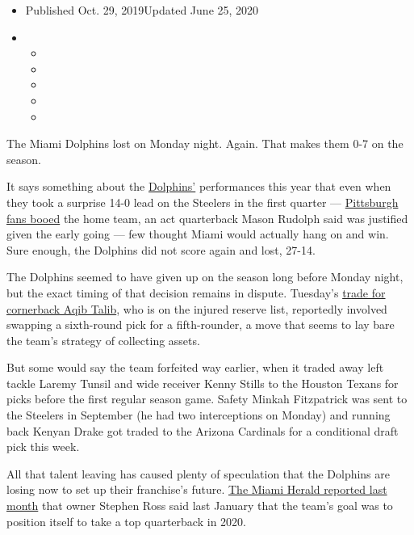 \begin{itemize}
\item
  Published Oct. 29, 2019Updated June 25, 2020
\item
  \begin{itemize}
  \item
  \item
  \item
  \item
  \item
  \end{itemize}
\end{itemize}

The Miami Dolphins lost on Monday night. Again. That makes them 0-7 on
the season.

It says something about the
\href{https://www.nytimes3xbfgragh.onion/2020/06/25/science/dolphins-shells-learning.html}{Dolphins'}
performances this year that even when they took a surprise 14-0 lead on
the Steelers in the first quarter ---
\href{https://www.espn.com/nfl/recap?gameId=401128074}{Pittsburgh fans
booed} the home team, an act quarterback Mason Rudolph said was
justified given the early going --- few thought Miami would actually
hang on and win. Sure enough, the Dolphins did not score again and lost,
27-14.

The Dolphins seemed to have given up on the season long before Monday
night, but the exact timing of that decision remains in dispute.
Tuesday's
\href{https://twitter.com/MiamiDolphins/status/1189248844359438336}{trade
for cornerback Aqib Talib}, who is on the injured reserve list,
reportedly involved swapping a sixth-round pick for a fifth-rounder, a
move that seems to lay bare the team's strategy of collecting assets.

But some would say the team forfeited way earlier, when it traded away
left tackle Laremy Tunsil and wide receiver Kenny Stills to the Houston
Texans for picks before the first regular season game. Safety Minkah
Fitzpatrick was sent to the Steelers in September (he had two
interceptions on Monday) and running back Kenyan Drake got traded to the
Arizona Cardinals for a conditional draft pick this week.

All that talent leaving has caused plenty of speculation that the
Dolphins are losing now to set up their franchise's future.
\href{https://www.miamiherald.com/sports/spt-columns-blogs/barry-jackson/article234548232.html}{The
Miami Herald reported last month} that owner Stephen Ross said last
January that the team's goal was to position itself to take a top
quarterback in 2020.

